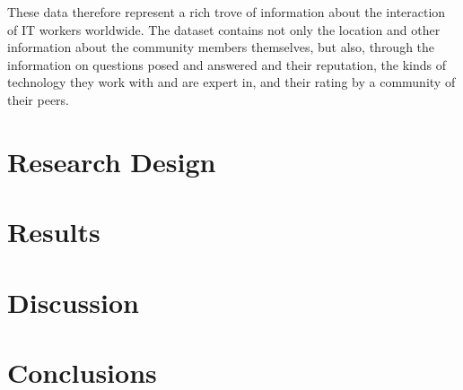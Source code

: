 \documentclass[11pt]{article}
\begin{document}
These data therefore represent a rich trove of information about the
interaction of IT workers worldwide. The dataset contains not only the location
and other information about the community members themselves, but also,
through the information on questions posed and answered and their reputation, the
kinds of technology they work with and are expert in, and their rating by
a community of their peers. 

 


\section{Research Design}
\label{sec:research-design}

\section{Results}
\label{sec:results}

\section{Discussion}
\label{sec:discussion}

\section{Conclusions}
\label{sec:conclusions}


\FloatBarrier


\end{document}

